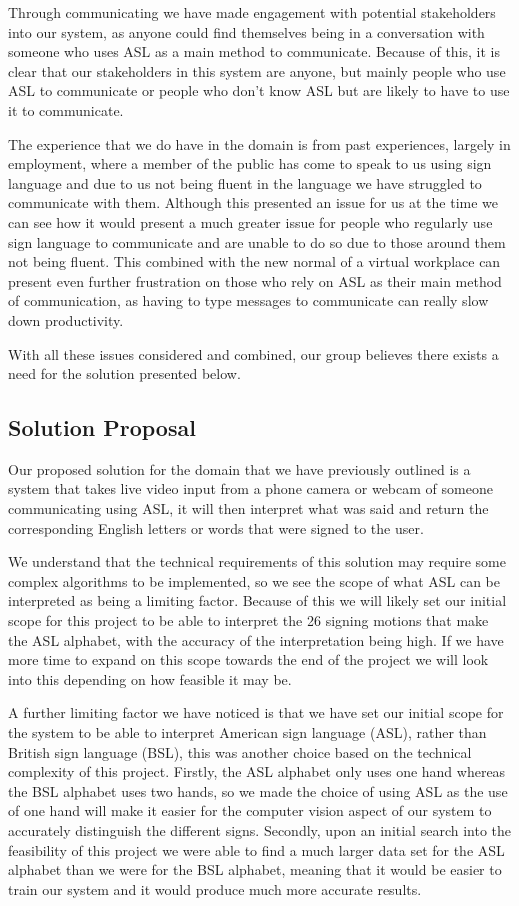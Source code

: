 \documentclass[10pt]{article}
\begin{document}
Through communicating we have made engagement with potential stakeholders into our system, as anyone 
could find themselves being in a conversation with someone who uses ASL as a main method to 
communicate. Because of this, it is clear that our stakeholders in this system are anyone, but 
mainly people who use ASL to communicate or people who don't know ASL but are likely to have to use 
it to communicate.

The experience that we do have in the domain is from past experiences, largely in employment, where 
a member of the public has come to speak to us using sign language and due to us not being fluent in 
the language we have struggled to communicate with them. Although this presented an issue for us at 
the time we can see how it would present a much greater issue for people who regularly use sign 
language to communicate and are unable to do so due to those around them not being fluent. This 
combined with the new normal of a virtual workplace can present even further frustration on those 
who rely on ASL as their main method of communication, as having to type messages to communicate can 
really slow down productivity.

With all these issues considered and combined, our group believes there exists a need for the 
solution presented below.

\subsection{Solution Proposal}

Our proposed solution for the domain that we have previously outlined is a system that takes live 
video input from a phone camera or webcam of someone communicating using ASL, it will then interpret 
what was said and return the corresponding English letters or words that were signed to the user.

We understand that the technical requirements of this solution may require some complex algorithms 
to be implemented, so we see the scope of what ASL can be interpreted as being a limiting factor. 
Because of this we will likely set our initial scope for this project to be able to interpret the
26 signing motions that make the ASL alphabet, with the accuracy of the interpretation being high.
If we have more time to expand on this scope towards the end of the project we will look into this 
depending on how feasible it may be.

A further limiting factor we have noticed is that we have set our initial scope for the system to be 
able to interpret American sign language (ASL), rather than British sign language (BSL), this was 
another choice based on the technical complexity of this project. Firstly, the ASL alphabet only 
uses one hand whereas the BSL alphabet uses two hands, so we made the choice of using ASL as the use 
of one hand will make it easier for the computer vision aspect of our system to accurately 
distinguish the different signs. Secondly, upon an initial search into the feasibility of this 
project we were able to find a much larger data set for the ASL alphabet than we were for the BSL 
alphabet, meaning that it would be easier to train our system and it would produce much more 
accurate results. 
\end{document}
